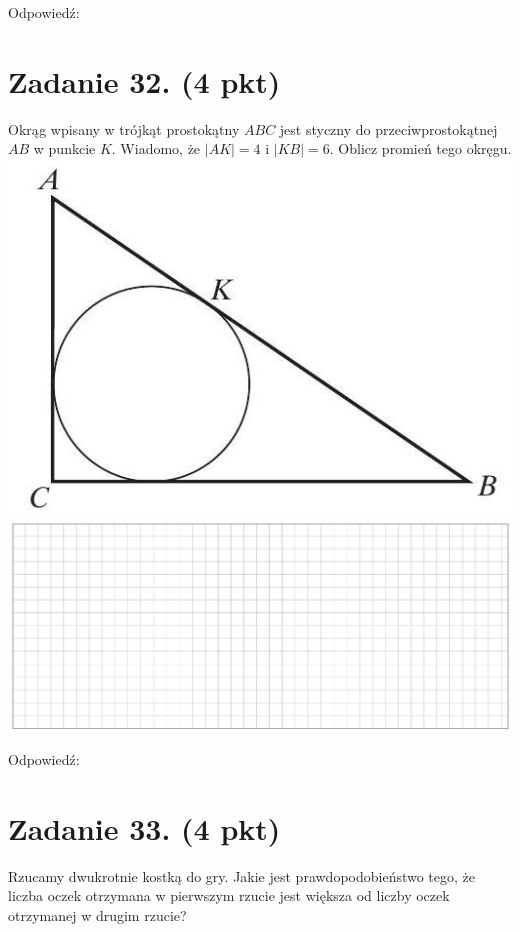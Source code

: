 \documentclass[10pt]{article}
\begin{document}
Odpowiedź: \(\qquad\)

\section*{Zadanie 32. (4 pkt)}
Okrąg wpisany w trójkąt prostokątny \(A B C\) jest styczny do przeciwprostokątnej \(A B\) w punkcie \(K\). Wiadomo, że \(|A K|=4\) i \(|K B|=6\). Oblicz promień tego okręgu.\\
\includegraphics[max width=\textwidth, center]{2024_11_21_3a102e13f4b06a61f46fg-13}\\
\includegraphics[max width=\textwidth, center]{2024_11_21_3a102e13f4b06a61f46fg-13(1)}

Odpowiedź: \(\qquad\)

\section*{Zadanie 33. (4 pkt)}
Rzucamy dwukrotnie kostką do gry. Jakie jest prawdopodobieństwo tego, że liczba oczek otrzymana w pierwszym rzucie jest większa od liczby oczek otrzymanej w drugim rzucie?
\end{document}
